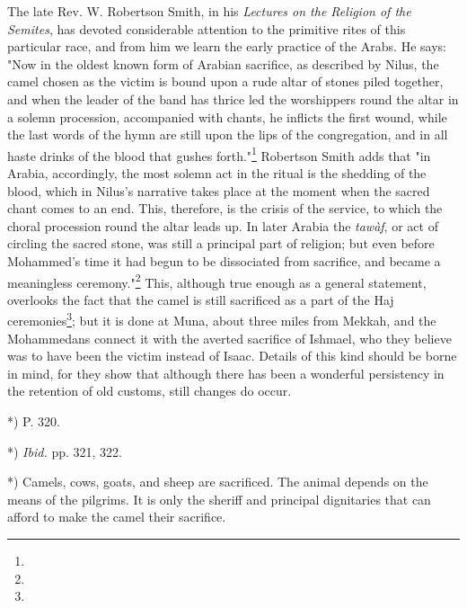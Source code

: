 \documentclass[a4paper, 11pt, oneside, polutonikogreek, english]{article}
\begin{document}
The late Rev. W. Robertson Smith, in his \emph{Lectures on the Religion of the Semites}, has devoted considerable attention to the primitive rites of this particular race, and from him we learn the early practice of the Arabs. He says: "Now in the oldest known form of Arabian sacrifice, as described by Nilus, the camel chosen as the victim is bound upon a rude altar of stones piled together, and when the leader of the band has thrice led the worshippers round the altar in a solemn procession, accompanied with chants, he inflicts the first wound, while the last words of the hymn are still upon the lips of the congregation, and in all haste drinks of the blood that gushes forth."\footnote{} Robertson Smith adds that "in Arabia, accordingly, the most solemn act in the ritual is the shedding of the blood, which in Nilus's narrative takes place at the moment when the sacred chant comes to an end. This, therefore, is the crisis of the service, to which the choral procession round the altar leads up. In later Arabia the \emph{tawàf}, or act of circling the sacred stone, was still a principal part of religion; but even before Mohammed's time it had begun to be dissociated from sacrifice, and became a meaningless ceremony."\footnote{} This, although true enough as a general statement, overlooks the fact that the camel is still sacrificed as a part of the Haj ceremonies\footnote{}; but it is done at Muna, about three miles from Mekkah, and the Mohammedans connect it with the averted sacrifice of Ishmael, who they believe was to have been the victim instead of Isaac. Details of this kind should be borne in mind, for they show that although there has been a wonderful persistency in the retention of old customs, still changes do occur.

*) P. 320.

*) \emph{Ibid.} pp. 321, 322.

*) Camels, cows, goats, and sheep are sacrificed. The animal depends on the means of the pilgrims. It is only the sheriff and principal dignitaries that can afford to make the camel their sacrifice.
\end{document}
